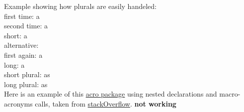 %

Example showing how plurals are easily handeled:
\\
first time: \ac{a} \\
second time: \ac{a} \\
short: \acs{a} \\
alternative:  \\
first again: \acf{a} \\
long: \acl{a} \\
short plural: \acsp{a} \\
long plural: \aclp{a} \\

Here is an example of this \href{}{acro package}
using nested declarations and macro-acronyms calls, taken from
\href{http://tex.stackexchange.com/questions/135975/how-to-define-an-acronym-by-using-other-acronym-and-print-the-abbreviations-toge}{stackOverflow}.
\textbf{not working}




